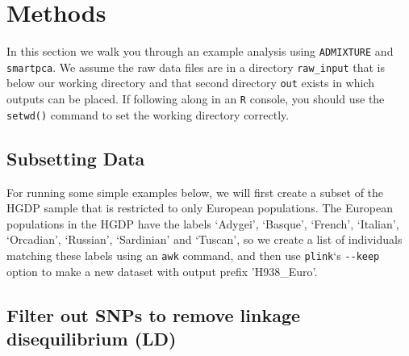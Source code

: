 \documentclass[smallextended]{svmult}       %
\newenvironment{Shaded}{\begin{snugshade}}{\end{snugshade}}
\newcommand{\DataTypeTok}[1]{\textcolor[rgb]{0.13,0.29,0.53}{#1}}
\newcommand{\StringTok}[1]{\textcolor[rgb]{0.31,0.60,0.02}{#1}}
\newcommand{\FunctionTok}[1]{\textcolor[rgb]{0.00,0.00,0.00}{#1}}
\newcommand{\OperatorTok}[1]{\textcolor[rgb]{0.81,0.36,0.00}{\textbf{#1}}}
\newcommand{\ExtensionTok}[1]{#1}
\newcommand{\NormalTok}[1]{#1}
\begin{document}
\section{Methods}\label{methods}

In this section we walk you through an example analysis using
\texttt{ADMIXTURE} and \texttt{smartpca}. We assume the raw data files
are in a directory \texttt{raw\_input} that is below our working
directory and that second directory \texttt{out} exists in which outputs
can be placed. If following along in an \texttt{R} console, you should
use the \texttt{setwd()} command to set the working directory correctly.

\subsection{Subsetting Data}\label{subsetting-data}

For running some simple examples below, we will first create a subset of
the HGDP sample that is restricted to only European populations. The
European populations in the HGDP have the labels `Adygei', `Basque',
`French', `Italian', `Orcadian', `Russian', `Sardinian' and `Tuscan', so
we create a list of individuals matching these labels using an
\texttt{awk} command, and then use \texttt{plink}`s \texttt{-\/-keep}
option to make a new dataset with output prefix 'H938\_Euro'.

\begin{Shaded}
\end{Shaded}

\subsection{Filter out SNPs to remove linkage disequilibrium
(LD)}\label{filter-out-snps-to-remove-linkage-disequilibrium-ld}
\end{document}
